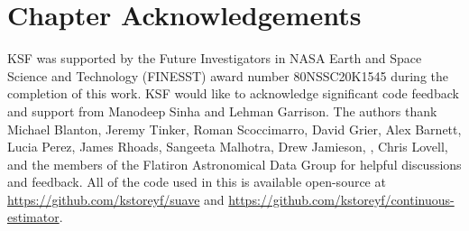 

\section{Chapter Acknowledgements}
KSF was supported by the Future Investigators in NASA Earth and Space Science and Technology (FINESST) award number 80NSSC20K1545 during the completion of this work.
KSF would like to acknowledge significant code feedback and support from Manodeep Sinha and Lehman Garrison.
The authors thank Michael Blanton, Jeremy Tinker, Roman Scoccimarro, David Grier, Alex Barnett,  Lucia Perez, James Rhoads, Sangeeta Malhotra, Drew Jamieson, , Chris Lovell, and the members of the Flatiron Astronomical Data Group for helpful discussions and feedback.
All of the code used in this \documentname is available open-source at \url{https://github.com/kstoreyf/suave} and \url{https://github.com/kstoreyf/continuous-estimator}. 

